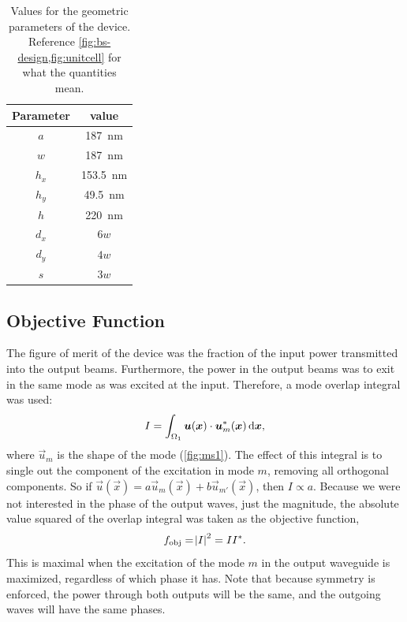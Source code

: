 \begin{table}[htpb]
	\centering
	\caption{%
		Values for the geometric parameters of the device.
		Reference \cref{fig:bs-design,fig:unitcell} for what the quantities
		mean.
	}%
	\label{tab:params}

	\begin{tabular}{cc}
		\toprule
		Parameter & value\\
		\midrule
		$a$ & \qty{187}{\nm}\\
		$w$ & \qty{187}{\nm}\\
		$h_x$ & \qty{153.5}{\nm}\\
		$h_y$ & \qty{49.5}{\nm}\\
		$h$ & \qty{220}{\nm}\\
		$d_x$ & $6 w$\\
		$d_y$ & $4 w$\\
		$s$ & $3 w$\\
		\bottomrule
	\end{tabular}
\end{table}

\subsection{Objective Function}

The figure of merit of the device was the fraction of the input power transmitted
into the output beams.
Furthermore, the power in the output beams was to exit in the same mode as was
excited at the input.
Therefore, a mode overlap integral was used:
\begin{equation}
	I = \int_{\Omega_1} \vec{u}(\vec{x}) \cdot \vec{u}_m^*(\vec{x}) \dl{\vec x},
\end{equation}
where $\vec u_m$ is the shape of the mode (\cref{fig:ms1}).
The effect of this integral is to single out the component of the excitation in
mode $m$, removing all orthogonal components.
So if $\vec u(\vec x) = a \vec u_m(\vec x) + b \vec u_{m'}(\vec x)$,
then $I \propto a$.
Because we were not interested in the phase of the output waves, just the magnitude,
the absolute value squared of the overlap integral was taken as the objective
function,
\begin{equation}
	f_\text{obj} = \abs{I}^2 = I I^*.
\end{equation}
This is maximal when the excitation of the mode $m$ in the output
waveguide is maximized, regardless of which phase it has.
Note that because symmetry is enforced, the power through both outputs will be
the same, and the outgoing waves will have the same phases.

